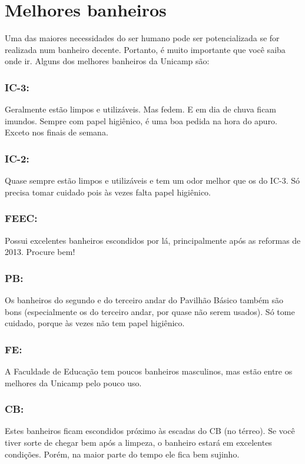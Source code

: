 
\section{Melhores banheiros}

Uma das maiores necessidades do ser humano pode ser potencializada se for
realizada num banheiro decente. Portanto, é muito importante que você saiba onde
ir. Alguns dos melhores banheiros da Unicamp são:

\subsubsection{IC-3:} Geralmente estão limpos e utilizáveis. Mas fedem. E em dia
de chuva ficam imundos. Sempre com papel higiênico, é uma boa pedida na hora do
apuro. Exceto nos finais de semana.

\subsubsection{IC-2:} Quase sempre estão limpos e utilizáveis e tem um odor
melhor que os do IC-3. Só precisa tomar cuidado pois às vezes falta papel
higiênico.

\subsubsection{FEEC:} Possui excelentes banheiros escondidos por lá,
principalmente após as reformas de 2013. Procure bem!

\subsubsection{PB:} Os banheiros do segundo e do terceiro andar do Pavilhão
Básico também são bons (especialmente os do terceiro andar, por quase não serem
usados). Só tome cuidado, porque às vezes não tem papel higiênico.

\subsubsection{FE:} A Faculdade de Educação tem poucos banheiros masculinos, mas
estão entre os melhores da Unicamp pelo pouco uso.

\subsubsection{CB:} Estes banheiros ficam escondidos próximo às escadas do CB
(no térreo). Se você tiver sorte de chegar bem após a limpeza, o banheiro estará
em excelentes condições. Porém, na maior parte do tempo ele fica bem sujinho.

